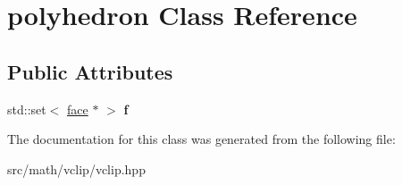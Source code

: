 \hypertarget{classpolyhedron}{
\section{polyhedron Class Reference}
\label{classpolyhedron}
}
\subsection*{Public Attributes}
\begin{DoxyCompactItemize}
\item 
\hypertarget{classpolyhedron_abfafc703e4310ed74d41261c72cd0530}{
std::set$<$ \hyperlink{classface}{face} $\ast$ $>$ {\bfseries f}}
\label{classpolyhedron_abfafc703e4310ed74d41261c72cd0530}

\end{DoxyCompactItemize}


The documentation for this class was generated from the following file:\begin{DoxyCompactItemize}
\item 
src/math/vclip/vclip.hpp\end{DoxyCompactItemize}
